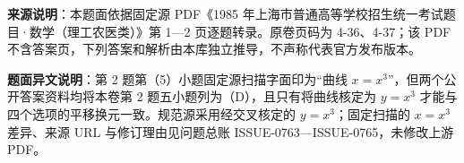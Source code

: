 

\begin{gktip}
\textbf{来源说明}：本题面依据固定源 PDF《1985 年上海市普通高等学校招生统一考试题目·数学（理工农医类）》第 1—2 页逐题转录。原卷页码为 4-36、4-37；该 PDF 不含答案页，下列答案和解析由本库独立推导，不声称代表官方发布版本。

\textbf{题面异文说明}：第 2 题第（5）小题固定源扫描字面印为“曲线 $x=x^3$”，但两个公开答案资料均将本卷第 2 题五小题列为（D），且只有将曲线核定为 $y=x^3$ 才能与四个选项的平移换元一致。规范源采用经交叉核定的 $y=x^3$；固定扫描的 $x=x^3$ 差异、来源 URL 与修订理由见问题总账 ISSUE-0763—ISSUE-0765，未修改上游 PDF。
\end{gktip}

